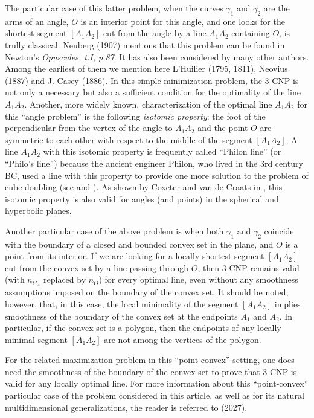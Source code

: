 \documentclass[a4paper,12pt]{amsart}
\def\g{\gamma}
\begin{document}
The particular case of this latter problem, when the curves
$\g_1$ and $\g_2$ are the arms of an angle, $O$ is an interior point for this angle, and one looks for the shortest segment
$[A_1A_2]$ cut from the angle by a line $A_1A_2$ containing $O$, is trully classical.
Neuberg  \cite{NBRG} (1907) mentions that this problem can be found in  Newton's
{\it Opuscules, t.I, p.87}.
It has also been considered by many other authors.
Among the earliest of them we mention here  L'Huilier \cite{SL,SL1}(1795, 1811), Neovius \cite{EN}(1887) and  J. Casey \cite{JCas} (1886).
In this simple minimization problem, the 3-CNP is not only a necessary but also a sufficient condition for the optimality of the line $A_1A_2$. Another, more widely known, characterization of the optimal line $A_1A_2$ for this ``angle problem'' is the following {\it isotomic property}: the foot of the perpendicular from the vertex of the angle to $A_1A_2$ and the point $O$ are symmetric to each other with respect to the middle of the segment $[A_1A_2]$. A line $A_1A_2$ with this isotomic property is frequently called ``Philon line'' (or ``Philo's line'') because the ancient
engineer Philon, who lived in the 3rd century BC, used a line with this property to provide one more solution to the problem of cube doubling  (see \cite{Wiki1} and \cite{Wiki2}). As shown by Coxeter and van de Craats in \cite{CC}, this
isotomic property is also valid for angles (and points) in the spherical and hyperbolic planes.

\medskip

Another particular case of the above problem is when both
$\g_1$ and $\g_2$ coincide with the boundary of a closed and bounded convex set in the plane, and $O$ is a point from its interior.
If we are looking for a locally shortest segment
$[A_1A_2]$ cut from the convex set by a line passing
through $O$, then 3-CNP remains valid  (with $n_{C_{A}}$ replaced by $n_O$) for every optimal line, even without
any smoothness assumptions imposed on the boundary of the convex set. It should be noted, however, that, in this case, the local minimality of the segment
$[A_1A_2]$ implies smoothness of the boundary of the convex set at
the endpoints $A_1$ and $A_2$.  In particular, if the convex set is a polygon, then the endpoints of any locally minimal segment
 $[A_1A_2]$ are not among the vertices of the polygon.

For the related maximization problem in this ``point-convex'' setting, one does need the smoothness of the boundary of the convex set to prove that 3-CNP is valid for any locally optimal line. For more information about this ``point-convex'' particular  case of the problem considered in this article, as well as for its natural multidimensional generalizations,  the reader is referred to \cite{KMN}(2027).
\end{document}
